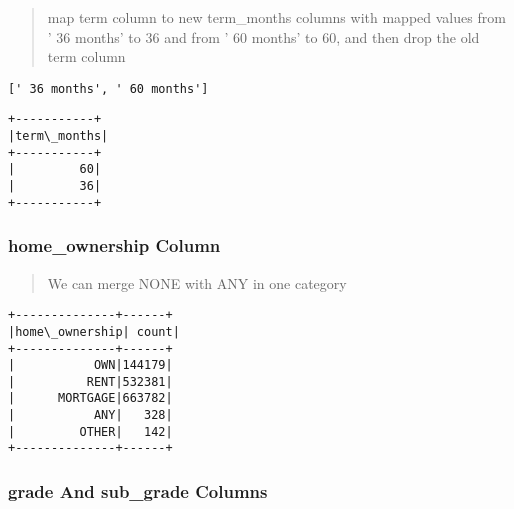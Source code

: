 \documentclass[11pt]{article}
\makeatletter
\newcommand{\boxspacing}{\kern\kvtcb@left@rule\kern\kvtcb@boxsep}
\newcommand{\prompt}[4]{
        {\ttfamily\llap{{\color{#2}[#3]:\hspace{3pt}#4}}\vspace{-\baselineskip}}
    }
\makeatother
\begin{document}
    \begin{quote}
map term column to new term\_months columns with mapped values from ' 36
months' to 36 and from ' 60 months' to 60, and then drop the old term
column
\end{quote}

            \begin{tcolorbox}[breakable, size=fbox, boxrule=.5pt, pad at break*=1mm, opacityfill=0]
\prompt{Out}{outcolor}{44}{\boxspacing}
\begin{Verbatim}[commandchars=\\\{\}]
[' 36 months', ' 60 months']
\end{Verbatim}
\end{tcolorbox}
        
    \begin{Verbatim}[commandchars=\\\{\}]
+-----------+
|term\_months|
+-----------+
|         60|
|         36|
+-----------+

    \end{Verbatim}

    \hypertarget{home_ownership-column}{%
\subsubsection{home\_ownership Column}\label{home_ownership-column}}

    \begin{quote}
We can merge NONE with ANY in one category
\end{quote}

    \begin{Verbatim}[commandchars=\\\{\}]
+--------------+------+
|home\_ownership| count|
+--------------+------+
|           OWN|144179|
|          RENT|532381|
|      MORTGAGE|663782|
|           ANY|   328|
|         OTHER|   142|
+--------------+------+

    \end{Verbatim}

    \hypertarget{grade-and-sub_grade-columns}{%
\subsubsection{grade And sub\_grade
Columns}\label{grade-and-sub_grade-columns}}

    \begin{center}
    \end{center}
    { \hspace*{\fill} \\}
    
\end{document}
